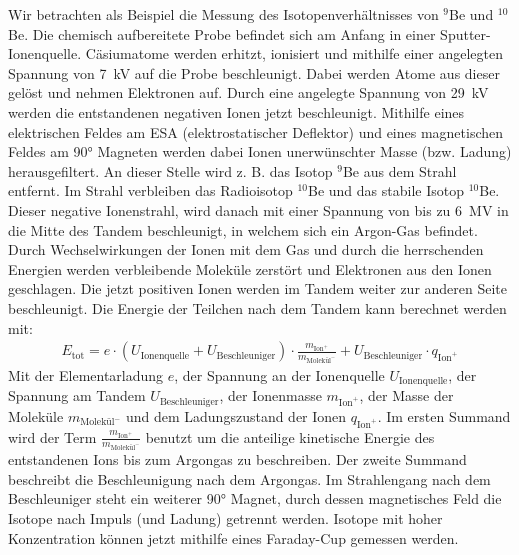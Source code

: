Wir betrachten als Beispiel die Messung des Isotopenverhältnisses von $^{9}$Be und $^{10}$Be.
Die chemisch aufbereitete Probe befindet sich am Anfang in einer Sputter-Ionenquelle.
Cäsiumatome werden erhitzt, ionisiert und mithilfe einer angelegten Spannung von \SI{7}{\kilo\volt} auf die Probe beschleunigt.
Dabei werden Atome aus dieser gelöst und nehmen Elektronen auf.
Durch eine angelegte Spannung von \SI{29}{\kilo\volt} werden die entstandenen negativen Ionen jetzt beschleunigt.
Mithilfe eines elektrischen Feldes am ESA (elektrostatischer Deflektor) und eines magnetischen Feldes am \ang{90} Magneten werden dabei Ionen unerwünschter Masse (bzw. Ladung) herausgefiltert.
An dieser Stelle wird z. B. das Isotop  $^{9}$Be aus dem Strahl entfernt.
Im Strahl verbleiben das Radioisotop $^{10}$Be und das stabile Isotop $^{10}$Be.
Dieser negative Ionenstrahl, wird danach mit einer Spannung von bis zu \SI{6}{\mega\volt} in die Mitte des Tandem beschleunigt, in welchem sich ein Argon-Gas befindet.
Durch Wechselwirkungen der Ionen mit dem Gas und durch die herrschenden Energien werden verbleibende Moleküle zerstört und Elektronen aus den Ionen geschlagen.
Die jetzt positiven Ionen werden im Tandem weiter zur anderen Seite beschleunigt.
Die Energie der Teilchen nach dem Tandem kann berechnet werden mit:
\begin{gather}
    E_{\text{tot}} = e \cdot (U_{\text{Ionenquelle}} + U_{\text{Beschleuniger}}) \cdot \frac{m_{\text{Ion}^{+}}}{m_{\text{Molekül}^{-}}} + U_{\text{Beschleuniger}} \cdot q_{\text{Ion}^{+}}
    \label{Theo_Energie_nach_Beschleuniger}
\end{gather}
Mit der Elementarladung $e$, der Spannung an der Ionenquelle $U_{\text{Ionenquelle}}$, der Spannung am Tandem $U_{\text{Beschleuniger}}$, der Ionenmasse $m_{\text{Ion}^{+}}$, der Masse der Moleküle $m_{\text{Molekül}^{-}}$ und dem Ladungszustand der Ionen $q_{\text{Ion}^{+}}$.
Im ersten Summand wird der Term $\frac{m_{\text{Ion}^{+}}}{m_{\text{Molekül}^{-}}}$ benutzt um die anteilige kinetische Energie des entstandenen Ions bis zum Argongas zu beschreiben.
Der zweite Summand beschreibt die Beschleunigung nach dem Argongas.
Im Strahlengang nach dem Beschleuniger steht ein weiterer \ang{90} Magnet, durch dessen magnetisches Feld die Isotope nach Impuls (und Ladung) getrennt werden.
Isotope mit hoher Konzentration können jetzt mithilfe eines Faraday-Cup gemessen werden.

